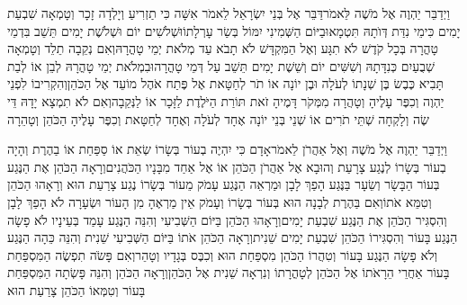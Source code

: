 \documentclass[../main/main.tex]{subfiles}
\begin{document}
\begin{multicols*}{\ncols}
וַיְדַבֵּר יַהְוֶה אֶל מֹשֶׁה לֵּאמֹר\PreVerseSpace{}דַּבֵּר אֶל בְּנֵי יִשְׂרָאֵל לֵאמֹר אִשָּׁה כִּי תַזְרִיעַ וְיָלְדָה זָכָר וְטָמְאָה שִׁבְעַת יָמִים כִּימֵי נִדַּת דְּוֺתָהּ תִּטְמָא\PreVerseSpace{}וּבַיּוֹם הַשְּׁמִינִי יִמּוֹל בְּשַׂר עָרְלָתוֹ\PreVerseSpace{}וּשְׁלֹשִׁים יוֹם וּשְׁלֹשֶׁת יָמִים תֵּשֵׁב בִּדְמֵי טָהֳרָה בְּכָל קֹדֶשׁ לֹא תִגָּע וְאֶל הַמִּקְדָּשׁ לֹא תָבֹא עַד מְלֹאת יְמֵי טָהֳרָהּ\PreVerseSpace{}וְאִם נְקֵבָה תֵלֵד וְטָמְאָה שְׁבֻעַיִם כְּנִדָּתָהּ וְשִׁשִּׁים יוֹם וְשֵׁשֶׁת יָמִים תֵּשֵׁב עַל דְּמֵי טָהֳרָה\PreVerseSpace{}וּבִמְלֹאת יְמֵי טָהֳרָהּ לְבֵן אוֹ לְבַת תָּבִיא כֶּבֶשׂ בֶּן שְׁנָתוֹ לְעֹלָה וּבֶן יוֹנָה אוֹ תֹר לְחַטָּאת אֶל פֶּתַח אֹהֶל מוֹעֵד אֶל הַכֹּהֵן\PreVerseSpace{}וְהִקְרִיבוֹ לִפְנֵי יַהְוֶה וְכִפֶּר עָלֶיהָ וְטָהֲרָה מִמְּקֹר דָּמֶיהָ זֹאת תּוֹרַת הַיֹּלֶדֶת לַזָּכָר אוֹ לַנְּקֵבָה\PreVerseSpace{}וְאִם לֹא תִמְצָא יָדָהּ דֵּי שֶׂה וְלָקְחָה שְׁתֵּי תֹרִים אוֹ שְׁנֵי בְּנֵי יוֹנָה אֶחָד לְעֹלָה וְאֶחָד לְחַטָּאת וְכִפֶּר עָלֶיהָ הַכֹּהֵן וְטָהֵרָה\OpenSection{}\par
{}וַיְדַבֵּר יַהְוֶה אֶל מֹשֶׁה וְאֶל אַהֲרֹן לֵאמֹר\PreVerseSpace{}אָדָם כִּי יִהְיֶה בְעוֹר בְּשָׂרוֹ שְׂאֵת אוֹ סַפַּחַת אוֹ בַהֶרֶת וְהָיָה בְעוֹר בְּשָׂרוֹ לְנֶגַע צָרָעַת וְהוּבָא אֶל אַהֲרֹן הַכֹּהֵן אוֹ אֶל אַחַד מִבָּנָיו הַכֹּהֲנִים\PreVerseSpace{}וְרָאָה הַכֹּהֵן אֶת הַנֶּגַע בְּעוֹר הַבָּשָׂר וְשֵׂעָר בַּנֶּגַע הָפַךְ לָבָן וּמַרְאֵה הַנֶּגַע עָמֹק מֵעוֹר בְּשָׂרוֹ נֶגַע צָרַעַת הוּא וְרָאָהוּ הַכֹּהֵן וְטִמֵּא אֹתוֹ\PreVerseSpace{}וְאִם בַּהֶרֶת לְבָנָה הוּא בְּעוֹר בְּשָׂרוֹ וְעָמֹק אֵין מַרְאֶהָ מִן הָעוֹר וּשְׂעָרָה לֹא הָפַךְ לָבָן וְהִסְגִּיר הַכֹּהֵן אֶת הַנֶּגַע שִׁבְעַת יָמִים\PreVerseSpace{}וְרָאָהוּ הַכֹּהֵן בַּיּוֹם הַשְּׁבִיעִי וְהִנֵּה הַנֶּגַע עָמַד בְּעֵינָיו לֹא פָשָׂה הַנֶּגַע בָּעוֹר וְהִסְגִּירוֹ הַכֹּהֵן שִׁבְעַת יָמִים שֵׁנִית\PreVerseSpace{}וְרָאָה הַכֹּהֵן אֹתוֹ בַּיּוֹם הַשְּׁבִיעִי שֵׁנִית וְהִנֵּה כֵּהָה הַנֶּגַע וְלֹא פָשָׂה הַנֶּגַע בָּעוֹר וְטִהֲרוֹ הַכֹּהֵן מִסְפַּחַת הוּא\SubEnd{} וְכִבֶּס בְּגָדָיו וְטָהֵר\PreVerseSpace{}וְאִם פָּשֹׂה תִפְשֶׂה הַמִּסְפַּחַת בָּעוֹר אַחֲרֵי הֵרָאֹתוֹ אֶל הַכֹּהֵן לְטָהֳרָתוֹ וְנִרְאָה שֵׁנִית אֶל הַכֹּהֵן\PreVerseSpace{}וְרָאָה הַכֹּהֵן וְהִנֵּה פָּשְׂתָה הַמִּסְפַּחַת בָּעוֹר וְטִמְּאוֹ הַכֹּהֵן צָרַעַת הוּא\OpenSection{}\par

\end{multicols*}
\end{document}
